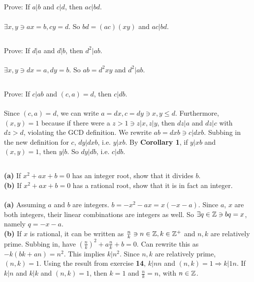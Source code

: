 \documentclass{article}
\begin{document}
\subsection{}
Prove: If $a|b$ and $c|d$, then $ac|bd$.\\~\\
$\exists x, y \ni ax = b, cy = d$.
So $bd = (ac)(xy)$ and $ac|bd$.

\subsection{}
Prove: If $d|a$ and $d|b$, then $d^2|ab$.\\~\\
$\exists x, y \ni dx = a, dy = b$.
So $ab = d^2xy$ and $d^2|ab$.

\subsection{}
Prove: If $c|ab$ and $(c, a) = d$, then $c|db$.\\~\\
Since $(c, a) = d$, we can write $a = dx, c = dy \ni x, y \leq d$.
Furthermore, $(x, y) = 1$ because if there were a
$z > 1 \ni z|x, z|y$, then $dz|a$ and $dz|c$ with $dz > d$, violating the GCD definition.
We rewrite $ab = dxb \ni c|dxb$.
Subbing in the new definition for $c$, $dy|dxb$, i.e. $y|xb$.
By \textbf{Corollary 1}, if $y|xb$ and $(x, y) = 1$, then $y|b$.
So $dy|db$, i.e. $c|db$.

\subsection{}
\textbf{(a)} If $x^2 + ax + b = 0$ has an integer root, show that it divides $b$.\\
\textbf{(b)} If $x^2 + ax + b = 0$ has a rational root, show that it is in fact an integer.\\~\\
\textbf{(a)} Assuming $a$ and $b$ are integers.
$b = -x^2 - ax = x(-x - a)$.
Since $a$, $x$ are both integers, their linear combinations are integers as well.
So $\exists q \in \mathbb{Z} \ni bq = x$, namely $q = -x - a$.\\
\textbf{(b)} If $x$ is rational, it can be written as $\frac{n}{k} \ni n \in \mathbb{Z}, k \in \mathbb{Z}^+$
and $n, k$ are relatively prime.
Subbing in, have $(\frac{n}{k})^2 + a\frac{n}{k} + b = 0$.
Can rewrite this as $-k(bk + an) = n^2$.
This implies $k|n^2$.
Since $n, k$ are relatively prime, $(n, k) = 1$.
Using the result from exercise \textbf{14}, $k|nn$ and $(n, k) = 1 \Rightarrow k|1n$.
If $k|n$ and $k|k$ and $(n, k) = 1$, then $k = 1$ and $\frac{n}{k} = n$, with $n \in \mathbb{Z}$.
\end{document}
